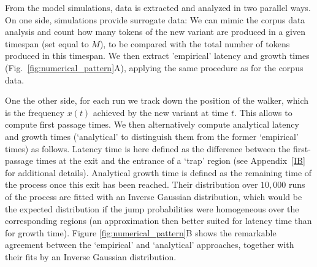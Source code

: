\documentclass[12pt,twocolumn,amsmath,amssymb,aps,longbibliography]{revtex4-1}  %
\begin{document}
From the model simulations, data is extracted and analyzed in two parallel ways. On one side, simulations provide surrogate data: We can mimic the corpus data analysis and count how many tokens of the new variant are produced in a given timespan (set equal to $M$), to be compared with the total number of tokens produced in this timespan. We then extract 'empirical' latency and growth times (Fig.~\ref{fig:numerical_pattern}A), applying the same procedure as for the corpus data.

\begin{figure*}[!tbp]
\caption{\small Numerical simulation of latency and growth times at the critical threshold. (A)~Time evolution of the frequency of produced occurrences (output of a single run). Growth part and latency part are separated by a red dotted line. The logit transform (with linear fit) of the growth is shown in the left inset, alongside with the sigmoidal fit of the rescaled frequency of the growth part (right inset). (B)~Distribution of latency times (top) and growth times (bottom) over $10k$ processes, extracted from an empirical approach (blue wide histogram) and a first-passage time one (magenta thin histogram), with their respective Inverse Gaussian fits (in red: Empirical approach; in green: First-passage time approach). (C)~Uncertainty on the transmission time given the position of the walker. The entrance and the exit of the trap are shown, respectively, by green and magenta lines. The red dotted line indicates the critical frequency $x_c$. The trap corresponds to the region where the uncertainty drops from a high value to a low value.}
\label{fig:numerical_pattern}
\end{figure*}

One the other side, for each run we track down the position of the walker, which is the frequency $x(t)$ achieved by the new variant at time $t$. This allows to compute first passage times. We then alternatively compute analytical latency and growth times (`analytical' to distinguish them from the former `empirical' times) as follows. Latency time is here defined as the difference between the first-passage times at the exit and the entrance of a `trap' region (see Appendix~\ref{IB} for additional details). Analytical growth time is defined as the remaining time of the process once this exit has been reached. Their distribution over $10,000$ runs of the process are fitted with an Inverse Gaussian distribution, which would be the expected distribution if the jump probabilities were homogeneous over the corresponding regions (an approximation then better suited for latency time than for growth time). Figure \ref{fig:numerical_pattern}B shows the remarkable agreement between  the `empirical' and `analytical' approaches, together with their fits by an Inverse Gaussian distribution.
\end{document}
